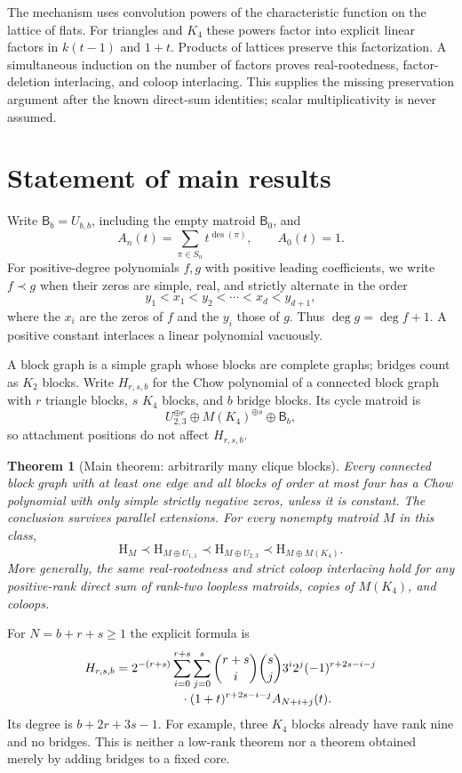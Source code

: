 \documentclass[12pt]{amsart}
\newtheorem{thm}{Theorem}[section]
\theoremstyle{definition}
\theoremstyle{remark}
\numberwithin{equation}{section}
\newcommand{\HCh}{\mathrm{H}}
\newcommand{\Bmat}{\mathsf{B}}
\newcommand{\des}{\operatorname{des}}
\begin{document}
The mechanism uses convolution powers of the characteristic function on the lattice of flats. For triangles and $K_4$ these powers factor into explicit linear factors in $k(t-1)$ and $1+t$. Products of lattices preserve this factorization. A simultaneous induction on the number of factors proves real-rootedness, factor-deletion interlacing, and coloop interlacing. This supplies the missing preservation argument after the known direct-sum identities; scalar multiplicativity is never assumed.

\section{Statement of main results}
Write $\Bmat_b=U_{b,b}$, including the empty matroid $\Bmat_0$, and
\[
 A_n(t)=\sum_{\pi\in S_n}t^{\des(\pi)},\qquad A_0(t)=1.
\]
For positive-degree polynomials $f,g$ with positive leading coefficients, we write $f\prec g$ when their zeros are simple, real, and strictly alternate in the order
\[
 y_1<x_1<y_2<\cdots<x_d<y_{d+1},
\]
where the $x_i$ are the zeros of $f$ and the $y_i$ those of $g$. Thus $\deg g=\deg f+1$. A positive constant interlaces a linear polynomial vacuously.


A block graph is a simple graph whose blocks are complete graphs; bridges count as $K_2$ blocks. Write $H_{r,s,b}$ for the Chow polynomial of a connected block graph with $r$ triangle blocks, $s$ $K_4$ blocks, and $b$ bridge blocks. Its cycle matroid is
\[
 U_{2,3}^{\oplus r}\oplus M(K_4)^{\oplus s}\oplus\Bmat_b,
\]
so attachment positions do not affect $H_{r,s,b}$.
\begin{samepage}
\begin{thm}[Main theorem: arbitrarily many clique blocks]\label{en-block-main}
Every connected block graph with at least one edge and all blocks of order at most four has a Chow polynomial with only simple strictly negative zeros, unless it is constant. The conclusion survives parallel extensions. For every nonempty matroid $M$ in this class,
\begin{equation}\label{en-block-chain}
 \HCh_M\prec\HCh_{M\oplus U_{1,1}}
 \prec\HCh_{M\oplus U_{2,3}}
 \prec\HCh_{M\oplus M(K_4)}.
\end{equation}
More generally, the same real-rootedness and strict coloop interlacing hold for any positive-rank direct sum of rank-two loopless matroids, copies of $M(K_4)$, and coloops.
\end{thm}
\end{samepage}
For $N=b+r+s\geq1$ the explicit formula is
\begin{equation}\label{en-block-formula}
\begin{split}
 H_{r,s,b}={}&2^{-(r+s)}
 \sum_{i=0}^{r+s}\sum_{j=0}^{s}
 \binom{r+s}{i}\binom{s}{j}3^i2^j
 (-1)^{r+2s-i-j}\\[-2pt]
 &\hspace{14mm}\cdot(1+t)^{r+2s-i-j}A_{N+i+j}(t).
\end{split}
\end{equation}
Its degree is $b+2r+3s-1$. For example, three $K_4$ blocks already have rank nine and no bridges. This is neither a low-rank theorem nor a theorem obtained merely by adding bridges to a fixed core.
\end{document}
